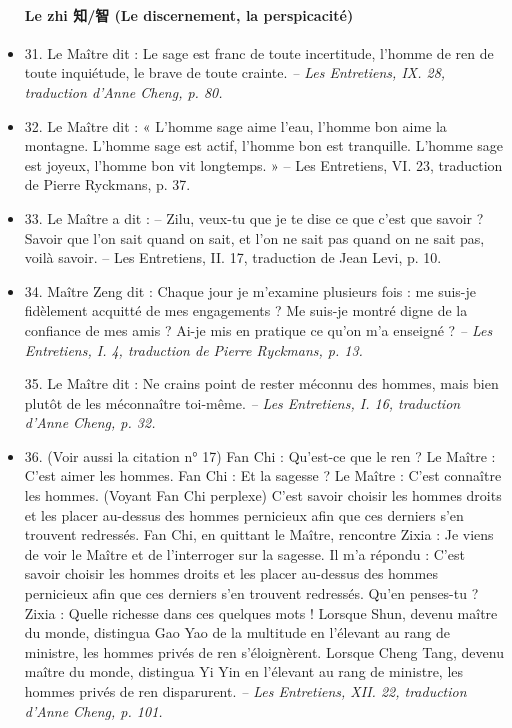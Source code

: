 \begin{itemize}
\paragraph{Le zhi 知/智 (Le discernement, la perspicacité)  }
\item 31. \newline Le Maître dit : Le sage est franc de toute incertitude, l’homme de ren de toute inquiétude, le brave de toute crainte.  \textit{\small -- Les Entretiens, IX. 28, traduction d’Anne Cheng, p. 80.  }
\item 32. \newline Le Maître dit : « L’homme sage aime l’eau, l’homme bon aime la montagne. L’homme sage est actif, l’homme bon est tranquille. L’homme sage est joyeux, l’homme bon vit longtemps. » -- Les Entretiens, VI. 23, traduction de Pierre Ryckmans, p. 37.  
\item 33. \newline Le Maître a dit : -- Zilu, veux-tu que je te dise ce que c’est que savoir ? Savoir que l’on sait quand on sait, et l’on ne sait pas quand on ne sait pas, voilà savoir.  -- Les Entretiens, II. 17, traduction de Jean Levi, p. 10.  

\item 34. Maître Zeng dit : Chaque jour je m’examine plusieurs fois : me suis-je fidèlement acquitté de mes engagements ? Me suis-je montré digne de la confiance de mes amis ? Ai-je mis en pratique ce qu’on m’a enseigné ? \textit{\small -- Les Entretiens, I. 4, traduction de Pierre Ryckmans, p. 13.  }

35. \newline Le Maître dit : Ne crains point de rester méconnu des hommes, mais bien plutôt de les méconnaître toi-même. \textit{\small -- Les Entretiens, I. 16, traduction d’Anne Cheng, p. 32.  }
\item 36. (Voir aussi la citation n° 17)  \newline Fan Chi : Qu’est-ce que le ren ?  \newline Le Maître : C’est aimer les hommes. \newline Fan Chi : Et la sagesse ?  \newline Le Maître : C’est connaître les hommes. (Voyant Fan Chi perplexe) C’est savoir choisir les hommes droits et les placer au-dessus des hommes pernicieux afin que ces derniers s’en trouvent redressés.   Fan Chi, en quittant  le Maître, rencontre Zixia : Je viens de voir  le Maître et de l’interroger sur la sagesse. Il m’a répondu : C’est savoir choisir les hommes droits et les placer au-dessus des hommes pernicieux afin que ces derniers s’en trouvent redressés. Qu’en penses-tu ? \newline Zixia : Quelle richesse dans ces quelques mots ! Lorsque Shun, devenu maître du monde, distingua Gao Yao de la multitude en l’élevant au rang de ministre, les hommes privés de ren s’éloignèrent. Lorsque Cheng Tang, devenu maître du monde, distingua Yi Yin en l’élevant au rang de ministre, les hommes privés de ren disparurent.   \textit{\small -- Les Entretiens, XII. 22, traduction d’Anne Cheng, p. 101.  }  

\end{itemize}
